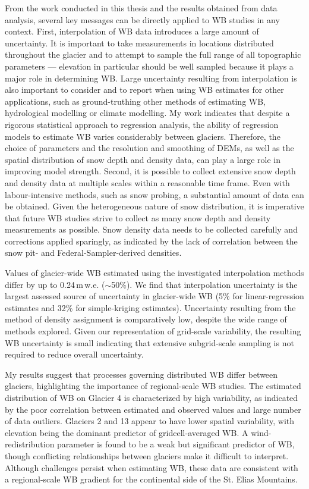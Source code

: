 \documentclass{sfuthesis}
\begin{document}
From the work conducted in this thesis and the results obtained from data analysis, several key messages can be directly applied to WB studies in any context. First, interpolation of WB data introduces a large amount of uncertainty. It is important to take measurements in locations distributed throughout the glacier and to attempt to sample the full range of all topographic parameters --- elevation in particular should be well sampled because it plays a major role in determining WB. Large uncertainty resulting from interpolation is also important to consider and to report when using WB estimates for other applications, such as ground-truthing other methods of estimating WB, hydrological modelling or climate modelling. My work indicates that despite a rigorous statistical approach to regression analysis, the ability of regression models to estimate WB varies considerably between glaciers. Therefore, the choice of parameters and the resolution and smoothing of DEMs, as well as the spatial distribution of snow depth and density data, can play a large role in improving model strength. Second, it is possible to collect extensive snow depth and density data at multiple scales within a reasonable time frame. Even with labour-intensive methods, such as snow probing, a substantial amount of data can be obtained. Given the heterogeneous nature of snow distribution, it is imperative that future WB studies strive to collect as many snow depth and density measurements as possible. Snow density data needs to be collected carefully and corrections applied sparingly, as indicated by the lack of correlation between the snow pit- and Federal-Sampler-derived densities. 

Values of glacier-wide WB estimated using the investigated interpolation methods differ by up to 0.24\,m\,w.e. ($\sim$50\%). We find that interpolation uncertainty is the largest assessed source of uncertainty in glacier-wide WB (5\% for linear-regression estimates and 32\% for simple-kriging estimates). Uncertainty resulting from the method of density assignment is comparatively low, despite the wide range of methods explored. Given our representation of grid-scale variability, the resulting WB uncertainty is small indicating that extensive subgrid-scale sampling is not required to reduce overall uncertainty. 

My results suggest that processes governing distributed WB differ between glaciers, highlighting the importance of regional-scale WB studies. The estimated distribution of WB on Glacier 4 is characterized by high variability, as indicated by the poor correlation between estimated and observed values and large number of data outliers. Glaciers 2 and 13 appear to have lower spatial variability, with elevation being the dominant predictor of gridcell-averaged WB. A wind-redistribution parameter is found to be a weak but significant predictor of WB, though conflicting relationships between glaciers make it difficult to interpret. Although challenges persist when estimating WB, these data are consistent with a regional-scale WB gradient for the continental side of the St. Elias Mountains.
\end{document}
